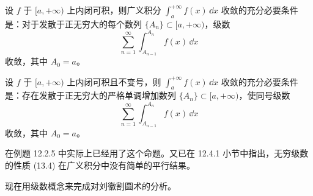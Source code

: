 \begin{xproposition}[13.1.1]
设 $f$ 于 $[a,+\infty)$ 上内闭可积，则广义积分 $\int_a^{+\infty}f(x)\,\dd x$ 收敛的充分必要条件是：对于发散于正无穷大的每个数列 $\{A_n\}\subset[a,+\infty)$，级数
\[
\sum_{n=1}^{\infty}\int_{A_{n-1}}^{A_n}f(x)\,\dd x
\]
收敛，其中 $A_0=a$。
\end{xproposition}

\begin{xproposition}[13.1.2]
设 $f$ 于 $[a,+\infty)$ 上内闭可积且不变号，则 $\int_a^{+\infty}f(x)\,\dd x$ 收敛的充分必要条件是：存在发散于正无穷大的严格单调增加数列 $\{A_n\}\subset[a,+\infty)$，使同号级数
\[
\sum_{n=1}^{\infty}\int_{A_{n-1}}^{A_n}f(x)\,\dd x
\]
收敛，其中 $A_0=a$。
\end{xproposition}

\begin{xremark}
在例题 12.2.5 中实际上已经用了这个命题。又已在 12.4.1 小节中指出，无穷级数的性质 (13.4) 在广义积分中没有简单的平行结果。
\end{xremark}

现在用级数概念来完成对刘徽割圆术的分析。

